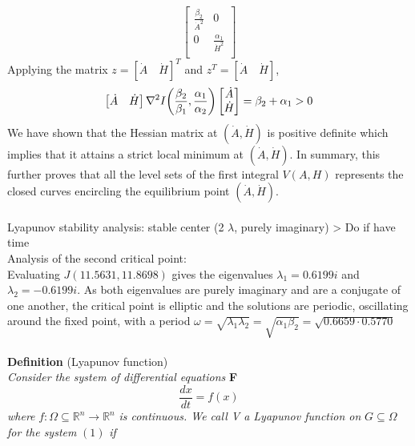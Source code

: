\documentclass{article}
\begin{document}
{\begin{equation*}
\begin{bmatrix}
    \frac{\beta_2}{\dot{A}^2} & 0 \\
    0 & \frac{\alpha_1}{\dot{H}^2} \\
\end{bmatrix}
\end{equation*}
Applying the matrix $z=[\dot{A}\quad\dot{H}]^T$ and $z^T=[\dot{A}\quad\dot{H}]$,
\begin{equation*}
\begin{bmatrix}
\dot{A} & \dot{H} \\
\end{bmatrix}
\nabla^2 I\bigg{(}\frac{\beta_2}{\beta_1},\frac{\alpha_1}{\alpha_2}\bigg{)}
\begin{bmatrix}
\dot{A} \\ \dot{H} \\
\end{bmatrix}
= \beta_2 + \alpha_1 > 0
\end{equation*}
We have shown that the  Hessian matrix at $(\dot{A},\dot{H})$ is positive definite which implies that it attains a strict local minimum at $(\dot{A},\dot{H})$. In summary, this further proves that all the level sets of the first integral $V(A,H)$ represents the closed curves encircling the equilibrium point $(\dot{A},\dot{H})$. \\ \\

Lyapunov stability analysis: stable center (2 $\lambda$, purely imaginary) > Do if have time}\\
Analysis of the second critical point:\\
Evaluating $J(11.5631,11.8698)$ gives the eigenvalues $\lambda_1=0.6199i$ and $\lambda_2=-0.6199i$. As both eigenvalues are purely imaginary and are a conjugate of one another, the critical point is elliptic and the solutions are periodic, oscillating around the fixed point, with a period $\omega=\sqrt{\lambda_1\lambda_2}=\sqrt{\alpha_1\beta_2}=\sqrt{0.6659\cdot0.5770}$\\
\\
\fi
\textbf{Definition} (Lyapunov function)\\
\noindent
\textit{Consider the system of differential equations} \textbf{F}
\begin{equation}
\frac{dx}{dt}=f(x)
\end{equation}
\textit{where }$f:\Omega\subseteq\mathbb{R}^n\rightarrow\mathbb{R}^n$ \textit{is continuous. We call V a Lyapunov function on } $G\subseteq\Omega$ \textit{for the system} $(1)$ \textit{ if }
\end{document}
